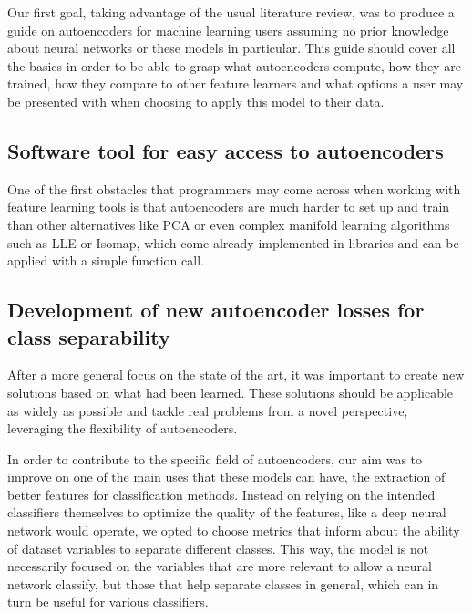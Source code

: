 Our first goal, taking advantage of the usual literature review, was to produce a guide on autoencoders for machine learning users assuming no prior knowledge about neural networks or these models in particular. This guide should cover all the basics in order to be able to grasp what autoencoders compute, how they are trained, how they compare to other feature learners and what options a user may be presented with when choosing to apply this model to their data.


\subsection{Software tool for easy access to autoencoders}

One of the first obstacles that programmers may come across when working with feature learning tools is that autoencoders are much harder to set up and train than other alternatives like PCA or even complex manifold learning algorithms such as LLE or Isomap, which come already implemented in libraries and can be applied with a simple function call.


\subsection{Development of new autoencoder losses for class separability}

After a more general focus on the state of the art, it was important to create new solutions based on what had been learned. These solutions should be applicable as widely as possible and tackle real problems from a novel perspective, leveraging the flexibility of autoencoders.

In order to contribute to the specific field of autoencoders, our aim was to improve on one of the main uses that these models can have, the extraction of better features for classification methods. Instead on relying on the intended classifiers themselves to optimize the quality of the features, like a deep neural network would operate, we opted to choose metrics that inform about the ability of dataset variables to separate different classes. This way, the model is not necessarily focused on the variables that are more relevant to allow a neural network classify, but those that help separate classes in general, which can in turn be useful for various classifiers.

